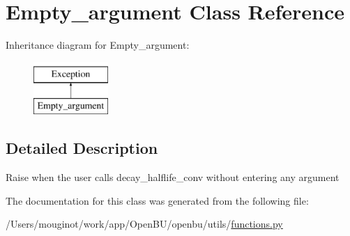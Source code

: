 \hypertarget{classopenbu_1_1utils_1_1functions_1_1_empty__argument}{}\section{Empty\+\_\+argument Class Reference}
\label{classopenbu_1_1utils_1_1functions_1_1_empty__argument}
Inheritance diagram for Empty\+\_\+argument\+:\begin{figure}[H]
\begin{center}
\leavevmode
\includegraphics[height=2.000000cm]{classopenbu_1_1utils_1_1functions_1_1_empty__argument}
\end{center}
\end{figure}


\subsection{Detailed Description}
\begin{DoxyVerb}Raise when the user calls decay_halflife_conv without entering any argument \end{DoxyVerb}
 

The documentation for this class was generated from the following file\+:\begin{DoxyCompactItemize}
\item 
/\+Users/mouginot/work/app/\+Open\+B\+U/openbu/utils/\mbox{\hyperlink{utils_2functions_8py}{functions.\+py}}\end{DoxyCompactItemize}
